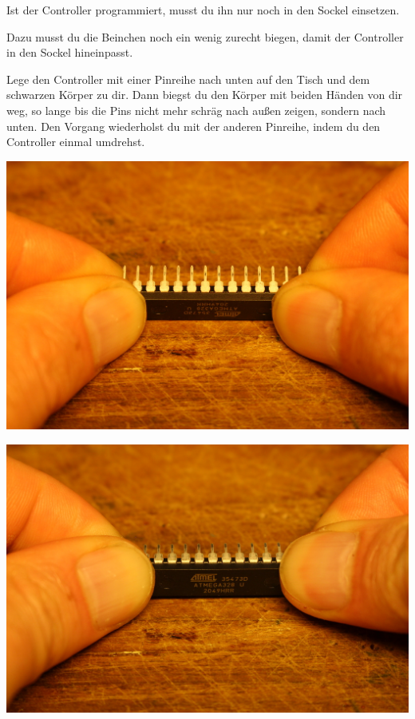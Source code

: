 \documentclass{article}
\begin{document}
Ist der Controller programmiert, musst du ihn nur noch in den Sockel einsetzen.

Dazu musst du die Beinchen noch ein wenig zurecht biegen, damit der Controller in den Sockel hineinpasst. 

Lege den Controller mit einer Pinreihe nach unten auf den Tisch und dem schwarzen Körper zu dir. Dann biegst du den Körper mit beiden Händen von dir weg, so lange bis die Pins nicht mehr schräg nach außen zeigen, sondern nach unten.
Den Vorgang wiederholst du mit der anderen Pinreihe, indem du den Controller einmal umdrehst.

\vspace{1cm}

\begin{minipage}[b]{0.5\textwidth}
	\includegraphics[width=\textwidth]{Bilder2021/IMG_8166.JPG}
\end{minipage}
\begin{minipage}[b]{0.5\textwidth}
	\includegraphics[width=\textwidth]{Bilder2021/IMG_8167.JPG}
\end{minipage}
\end{document}
